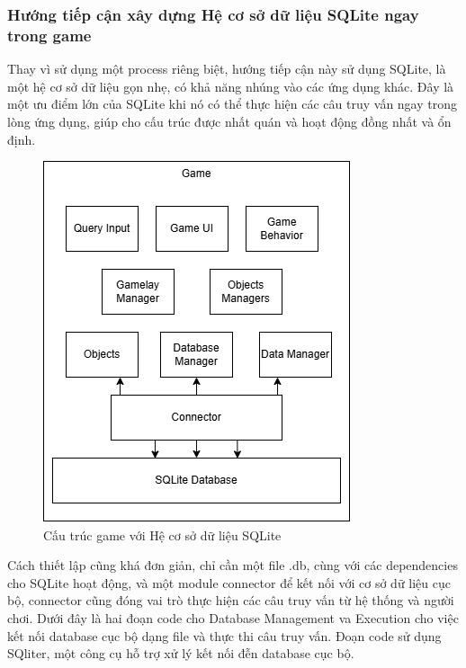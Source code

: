 \subsubsection{Hướng tiếp cận xây dựng Hệ cơ sở dữ liệu SQLite ngay trong game}
\hspace*{0.5cm} Thay vì sử dụng một process riêng biệt, hướng tiếp cận này sử dụng SQLite, là một hệ cơ sở dữ liệu gọn nhẹ, có khả năng nhúng vào các ứng dụng khác. Đây là một ưu điểm lớn của SQLite khi nó có thể thực hiện các câu truy vấn ngay trong lòng ứng dụng, giúp cho cấu trúc được nhất quán và hoạt động đồng nhất và ổn định.
\begin{figure}[H]
	\centering
	\includegraphics[width=\textwidth]{Images/SQLITE.png}
	\vspace{0.5cm}
	\caption{Cấu trúc game với Hệ cơ sở dữ liệu SQLite}
\end{figure}
\hspace{0.5cm} Cách thiết lập cũng khá đơn giản, chỉ cần một file .db, cùng với các dependencies cho SQLite hoạt động, và một module connector để kết nối với cơ sở dữ liệu cục bộ, connector cũng đóng vai trò thực hiện các câu truy vấn từ hệ thống và người chơi. Dưới đây là hai đoạn code cho Database Management va Execution cho việc kết nối database cục bộ dạng file và thực thi câu truy vấn. Đoạn code sử dụng SQliter, một công cụ hỗ trợ xử lý kết nối đễn database cục bộ.
